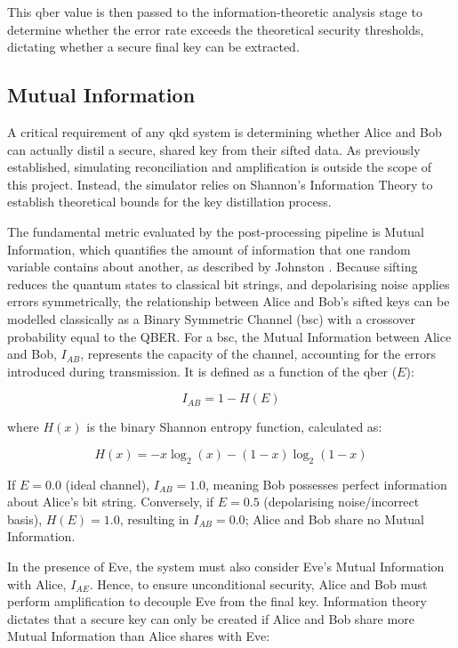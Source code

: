 This \gls{qber} value is then passed to the information-theoretic analysis stage to determine whether the error rate exceeds the theoretical security thresholds, dictating whether a secure final key can be extracted.

\subsection{Mutual Information}
\label{subsec:mutualinfo}

A critical requirement of any \gls{qkd} system is determining whether Alice and Bob can actually distil a secure, shared key from their sifted data. As previously established, simulating \gls{reconciliation} and \gls{amplification} is outside the scope of this project. Instead, the simulator relies on Shannon's Information Theory to establish theoretical bounds for the key distillation process.

The fundamental metric evaluated by the post-processing pipeline is Mutual Information, which quantifies the amount of information that one random variable contains about another, as described by Johnston \cite{mutualInfo}. Because \gls{sifting} reduces the quantum states to classical bit strings, and depolarising noise applies errors symmetrically, the relationship between Alice and Bob's sifted keys can be modelled classically as a Binary Symmetric Channel (\gls{bsc}) with a crossover probability equal to the QBER. For a \gls{bsc}, the Mutual Information between Alice and Bob, $I_{AB}$, represents the capacity of the channel, accounting for the errors introduced during transmission. It is defined as a function of the \gls{qber} ($E$):

\begin{equation}
I_{AB} = 1 - H(E)
\label{eq:mutual_info_ab}
\end{equation}

where $H(x)$ is the binary Shannon entropy function, calculated as:

\begin{equation}
H(x) = -x \log_2(x) - (1-x) \log_2(1-x)
\label{eq:shannon_entropy}
\end{equation}

If $E = 0.0$ (ideal channel), $I_{AB} = 1.0$, meaning Bob possesses perfect information about Alice's bit string. Conversely, if $E = 0.5$ (depolarising noise/incorrect basis), $H(E) = 1.0$, resulting in $I_{AB} = 0.0$; Alice and Bob share no Mutual Information.

In the presence of Eve, the system must also consider Eve's Mutual Information with Alice, $I_{AE}$. Hence, to ensure unconditional security, Alice and Bob must perform \gls{amplification} to decouple Eve from the final key. Information theory dictates that a secure key can only be created if Alice and Bob share more Mutual Information than Alice shares with Eve:

